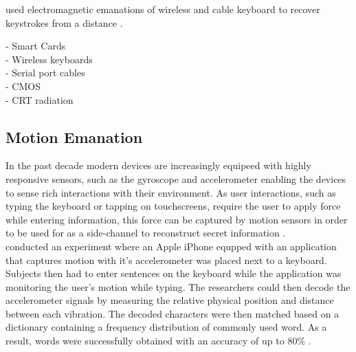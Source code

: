 
\cite{Vuagnoux:2009:CEE:1855768.1855769} used electromagnetic emanations of wireless and cable keyboard to recover keystrokes from a distance \cite{}. 

- Smart Cards \cite{Quisquater:2001:EAM:646803.705980}\\
- Wireless keyboards \cite{Vuagnoux:2009:CEE:1855768.1855769}\\
- Serial port cables \cite{serialcablearticle} \\
- CMOS \cite{Agrawal2003} \\
- CRT radiation \cite{vanEck:1985:ERV:7307.7308}

\subsection{Motion Emanation}
In the past decade modern devices are increasingly equipeed with highly responsive sensors, such as the gyroscope and accelerometer enabling the devices to sense rich interactions with their environment. As user interactions, such as typing the keyboard or tapping on touchscreens, require the user to apply force while entering information, this force can be captured by motion sensors in order to be used for as a side-channel to reconstruct secret information \cite{Tapprints, Accessory,Touchlogger}.\\

\citeauthor{Marquardt:2011:IDV:2046707.2046771} conducted an experiment where an Apple iPhone equpped with an application that captures motion with it's accelerometer was placed next to a keyboard. Subjects then had to enter sentences on the keyboard while the application was monitoring the user's motion while typing. The researchers could then decode the accelerometer signals by measuring the relative physical position and distance between each vibration. The decoded characters were then matched based on a dictionary containing a frequency distribution of commonly used word. As a result, words were successfully obtained with an accuracy of up to 80\% \cite{Marquardt:2011:IDV:2046707.2046771}.



